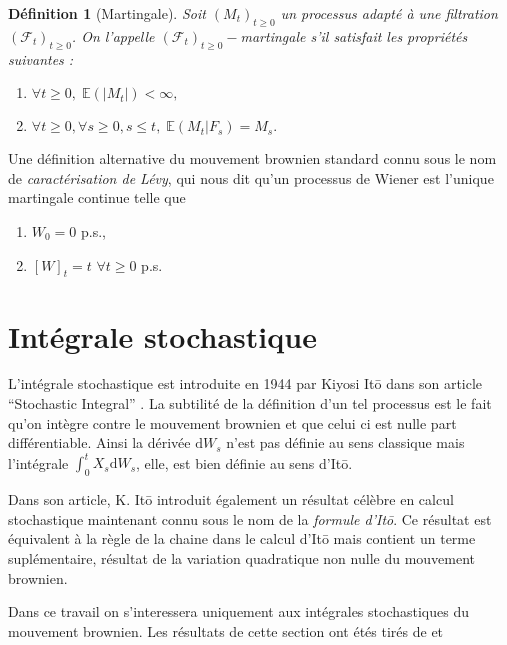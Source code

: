 \documentclass[openany]{book}
\newcommand{\F}{\mathscr{F}}
\newcommand{\E}{\mathbb{E}}
\newcommand{\1}{\mathbbm{1}}
\renewcommand{\d}{\mathrm{d}}
\theoremstyle{thmfont}
\theoremstyle{deffont}
\newtheorem{definition}[definition]{Définition}
\theoremstyle{thmfont}
\theoremstyle{deffont}
\newtheorem{remark}[remark]{Remarque}
\begin{document}
  \begin{definition}[Martingale]
  Soit $(M_t)_{t\geq0}$ un processus adapté à une filtration $(\F_t)_{t\geq0}$. On l'appelle $(\F_t)_{t\geq0}-$\textit{martingale} s'il satisfait les propriétés suivantes : 
  \begin{enumerate}
  \item $\forall t\geq 0,\;\E\left(|M_t|\right) < \infty,$
  \item $\forall t\geq 0, \forall s \geq 0, s \leq t,\;\E\left(M_t|F_s\right) = M_s.$
  \end{enumerate}
  \end{definition}
Une définition alternative du mouvement brownien standard connu sous le nom de \textit{caractérisation de Lévy}, qui nous dit qu'un processus de Wiener est l'unique martingale continue telle que
\begin{enumerate}
\item $W_0 = 0$ p.s.,
\item $[W]_t = t$ $\forall t\geq0$ p.s.
  \label{def:MvtBorwnien_caractLevy}
\end{enumerate}


\section{Intégrale stochastique}
L'intégrale stochastique est introduite en 1944 par Kiyosi Itō dans son article ``Stochastic Integral'' \cite{ito1944}. La subtilité de la définition d'un tel processus est le fait qu'on intègre contre le mouvement brownien et que celui ci est nulle part différentiable. Ainsi la dérivée $\d W_s$ n'est pas définie au sens classique mais l'intégrale $\int_0^t X_s \d W_s$, elle, est bien définie au sens d'Itō.

Dans son article, K. Itō introduit également un résultat célèbre en calcul stochastique maintenant connu sous le nom de la \textit{formule d'Itō}. Ce résultat est équivalent à la règle de la chaine dans le calcul d'Itō mais contient un terme suplémentaire, résultat de la variation quadratique non nulle du mouvement brownien.

Dans ce travail on s'interessera uniquement aux intégrales stochastiques du mouvement brownien. Les résultats de cette section ont étés tirés de \cite{russo} et \cite{fournier}%
\end{document}
